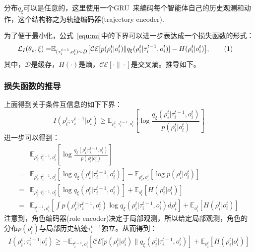 分布$q_\xi$可以是任意的，这里使用一个GRU~\cite{cho2014learning}来编码每个智能体自己的历史观测和动作，这个结构称之为轨迹编码器(trajectory encoder).

为了便于最小化，公式~\ref{equ:mi}中的下界可以进一步表达成一个损失函数的形式：
\begin{align*}
    \mathcal{L}_I(\theta_\rho, \xi) = & \mathbb{E}_{(\tau^{t-1}_i, o^t_i)\sim D}\big[\mathcal{CE}[p(\rho^{t}_i | o^t_i)\| q_\xi(\rho^{t}_i | \tau^{t-1}_i, o^t_i)] - H(\rho^{t}_i | o^t_i)\big],\stepcounter{equation}\tag{\theequation}
\end{align*}
其中，$\mathcal{D}$是缓存，$H(\cdot)$是熵，$\mathcal{CE[\cdot\|\cdot]}$是交叉熵。推导如下。

\subsubsection{损失函数的推导}
上面得到关于条件互信息的如下下界：
\begin{equation}
    I(\rho^t_i; \tau^{t-1}_i | o^t_i) \ge  \mathbb{E}_{\rho^t_i, \tau^{t-1}_i, o^t_i}\left[\log\frac{q_\xi(\rho^t_i | \tau^{t-1}_i, o^t_i)}{p(\rho^t_i | o^t_i)}\right]
    \label{equ:mi-2}
 \end{equation}
进一步可以得到：
\begin{equation}
    \begin{aligned}
       &\mathbb{E}_{\rho^t_i, \tau^{t-1}_i, o^t_i}\left[\log\frac{q_\xi(\rho^t_i | \tau^{t-1}_i, o^t_i)}{p(\rho^t_i | o^t_i)}\right]\\
      =&\mathbb{E}_{\rho^t_i, \tau^{t-1}_i, o^t_i}\left[\log q_\xi(\rho^t_i | \tau^{t-1}_i, o^t_i)\right]-\mathbb{E}_{\rho^t_i, o^t_i}\left[\log p(\rho^t_i | o^t_i)\right]\\
      =&\mathbb{E}_{\rho^t_i, \tau^{t-1}_i, o^t_i}\left[\log q_\xi(\rho^t_i | \tau^{t-1}_i, o^t_i)\right]+\mathbb{E}_{o^t_i}\left[H(\rho_i^t | o_i^t)\right] \\
      =&\mathbb{E}_{\tau^{t-1}_i, o^t_i}\left[\int p(\rho^t_i | \tau^{t-1}_i, o^t_i) \log q_\xi(\rho^t_i | \tau^{t-1}_i, o^t_i)d\rho^t_i\right] +\mathbb{E}_{o^t_i}\left[H(\rho_i^t | o_i^t)\right]
       \label{equ:mi_derivation}
    \end{aligned}
\end{equation}
注意到，角色编码器(role encoder)决定于局部观测，所以给定局部观测，角色的分布$p(\rho^t_i)$与局部历史轨迹$\tau^{t-1}_i$独立。从而得到：
\begin{equation}
    \begin{aligned}
          I(\rho^t_i; \tau^{t-1}_i | o^t_i) 
      \ge -\mathbb{E}_{\tau^{t-1}_i, o^t_i}\left[\mathcal{CE}[p(\rho^t_i | o^t_i) \| q_\xi(\rho^t_i | \tau^{t-1}_i, o^t_i)\right] +    \mathbb{E}_{o^t_i}\left[H(\rho_i^t | o_i^t)\right]
       \label{equ:mi_assumption}
    \end{aligned}
\end{equation}
